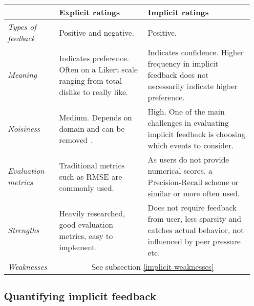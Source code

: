 \begin{table}[h!]
    \begin{tabular}{|l|p{6cm}|p{6cm}|}
    \hline
    ~                  & \textbf{Explicit ratings}
                       & \textbf{Implicit ratings} \\ \hline

    \textit{Types of feedback}  
                       & Positive and negative.
                       & Positive. \\ \hline

    \textit{Meaning}
                       & Indicates preference. Often on a Likert scale ranging
                         from total dislike to really like.
                       & Indicates confidence. Higher frequency in implicit 
                         feedback does not necessarily indicate higher
                         preference. \\ \hline

    \textit{Noisiness}
                       & Medium. Depends on domain and can be removed 
                         \cite{amatriain2009like}.
                       & High. One of the main challenges in evaluating
                         implicit feedback is choosing which events to
                         consider. \\ \hline

    \textit{Evaluation metrics}
                       & Traditional metrics such as RMSE are commonly used.
                       & As users do not provide numerical scores, a
                         Precision-Recall scheme or similar or more often used.
                         \\ \hline

    \textit{Strengths}
                       & Heavily researched, good evaluation metrics, easy to
                         implement.
                       & Does not require feedback from user, less sparsity and
                         catches actual behavior, not influenced by peer
                         pressure etc. \\ \hline

    \textit{Weaknesses}
                       & \multicolumn{2}{c|}{See subsection \ref{implicit-weaknesses}} \\ \hline
    \end{tabular}
\end{table}

\clearpage

\subsection{Quantifying implicit feedback}

